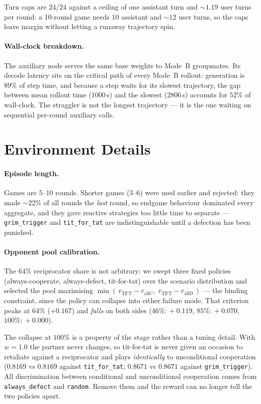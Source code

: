 \documentclass{article}
\begin{document}
Turn caps are $24/24$ against a ceiling of one assistant turn and ${\sim}1.19$
user turns per round: a 10-round game needs 10 assistant and ${\sim}12$ user
turns, so the caps leave margin without letting a runaway trajectory spin.

\paragraph{Wall-clock breakdown.} The auxiliary node serves the same base
weights to Mode~B groupmates. Its decode latency sits on the critical path of
every Mode~B rollout: generation is $89\%$ of step time, and because a step
waits for its slowest trajectory, the gap between mean rollout time
(1000\,s) and the slowest (2806\,s) accounts for $52\%$ of wall-clock. The
straggler is not the longest trajectory --- it is the one waiting on
sequential per-round auxiliary calls.

\section{Environment Details}
\label{app:env_details}

\paragraph{Episode length.} Games are 5--10 rounds. Shorter games (3--6) were
used earlier and rejected: they made ${\sim}22\%$ of all rounds the \emph{last}
round, so endgame behaviour dominated every aggregate, and they gave reactive
strategies too little time to separate --- \texttt{grim\_trigger} and
\texttt{tit\_for\_tat} are indistinguishable until a defection has been
punished.

\paragraph{Opponent pool calibration.} The $64\%$ reciprocator share is not
arbitrary: we swept three fixed policies (always-cooperate, always-defect,
tit-for-tat) over the scenario distribution and selected the pool maximising
$\min(\,\overline{r}_{\text{TFT}} - \overline{r}_{\text{allC}},\;
\overline{r}_{\text{TFT}} - \overline{r}_{\text{allD}}\,)$ --- the binding
constraint, since the policy can collapse into either failure mode. That
criterion peaks at $64\%$ ($+0.167$) and \emph{falls} on both sides
($46\%\!:\!+0.119$, $85\%\!:\!+0.070$, $100\%\!:\!+0.000$).

The collapse at $100\%$ is a property of the stage rather than a tuning
detail. With $w=1.0$ the partner never changes, so tit-for-tat is never given
an occasion to retaliate against a reciprocator and plays \emph{identically}
to unconditional cooperation ($0.8169$ vs $0.8169$ against
\texttt{tit\_for\_tat}; $0.8671$ vs $0.8671$ against \texttt{grim\_trigger}).
All discrimination between conditional and unconditional cooperation comes
from \texttt{always\_defect} and \texttt{random}. Remove them and the reward
can no longer tell the two policies apart.
\end{document}
